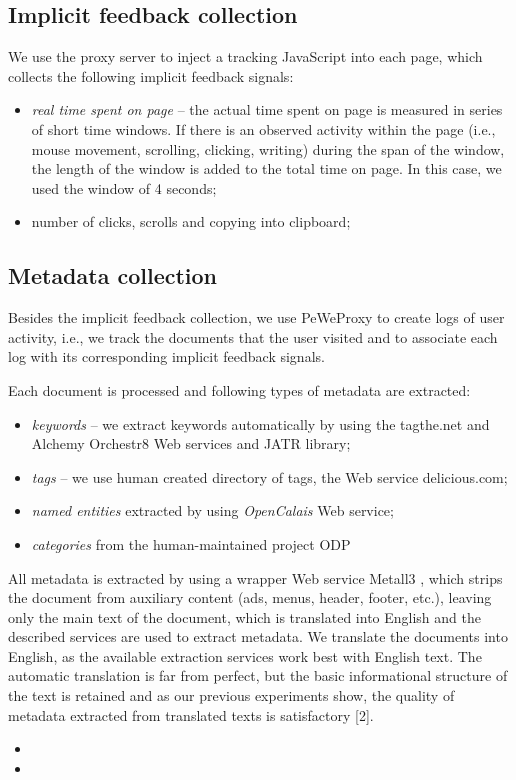 \documentclass{acm_proc_article-sp} %
\begin{document}
\subsection{Implicit feedback collection}

We use the proxy server to inject a tracking JavaScript into
each page, which collects the following implicit feedback signals:

\begin{itemize} 
	\item \textit{real time spent on page} – the actual time spent on page
	is measured in series of short time windows. If there
	is an observed activity within the page (i.e., mouse
	movement, scrolling, clicking, writing) during the span
	of the window, the length of the window is added to the
	total time on page. In this case, we used the window
	of 4 seconds;
	\item number of clicks, scrolls and copying into clipboard;
\end{itemize}

\subsection{Metadata collection}

Besides the implicit feedback collection, we use PeWeProxy
to create logs of user activity, i.e., we track the documents
that the user visited and to associate each log with its corresponding
implicit feedback signals.

Each document is processed and following types of metadata
are extracted:

\begin{itemize} 
	\item \textit{keywords} – we extract keywords automatically by using
	the tagthe.net and Alchemy Orchestr8 Web services
	and JATR library;
	\item \textit{tags} – we use human created directory of tags, the Web
		service delicious.com;
	\item \textit{named entities} extracted by using \textit{OpenCalais} Web
		service;
	\item \textit{categories} from the human-maintained project ODP
\end{itemize}

All metadata is extracted by using a wrapper Web service
Metall3
, which strips the document from auxiliary content
(ads, menus, header, footer, etc.), leaving only the main text
of the document, which is translated into English and the
described services are used to extract metadata. We translate
the documents into English, as the available extraction
services work best with English text. The automatic translation
is far from perfect, but the basic informational structure
of the text is retained and as our previous experiments show,
the quality of metadata extracted from translated texts is
satisfactory [2].






\begin{itemize} 
	\item
	\item
\end{itemize}





\balancecolumns
\end{document}
